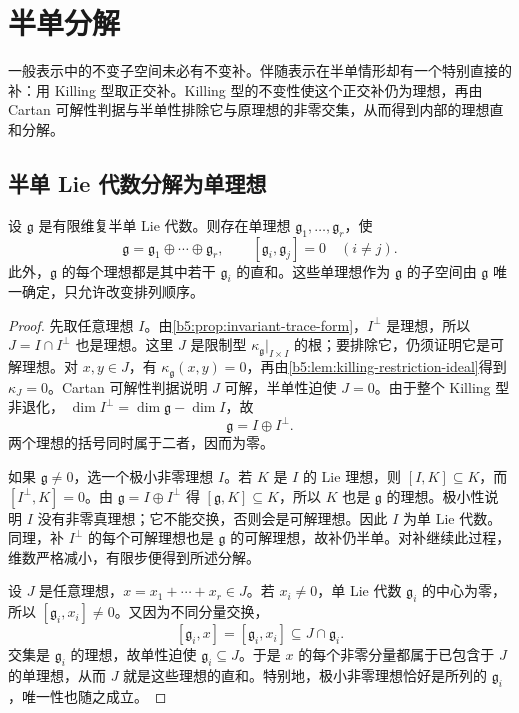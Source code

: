 
\section{半单分解}
\label{b5:sec:1303}

%
%

一般表示中的不变子空间未必有不变补。伴随表示在半单情形却有一个特别直接的补：用 Killing 型取正交补。Killing 型的不变性使这个正交补仍为理想，再由 Cartan 可解性判据与半单性排除它与原理想的非零交集，从而得到内部的理想直和分解。

\subsection{半单 Lie 代数分解为单理想}
\label{b5:subsec:1303:01}

\begin{theorem}\label{b5:thm:semisimple-ideal-decomposition}
	设 \(\mathfrak g\) 是有限维复半单 Lie 代数。则存在单理想 \(\mathfrak g_1,\ldots,\mathfrak g_r\)，使
	\[
		\mathfrak g=\mathfrak g_1\oplus\cdots\oplus\mathfrak g_r, \qquad[\mathfrak g_i,\mathfrak g_j]=0\quad(i\ne j).
	\]
	此外，\(\mathfrak g\) 的每个理想都是其中若干 \(\mathfrak g_i\) 的直和。这些单理想作为 \(\mathfrak g\) 的子空间由 \(\mathfrak g\) 唯一确定，只允许改变排列顺序。
\end{theorem}
\begin{proof}
	先取任意理想 \(I\)。由\cref{b5:prop:invariant-trace-form}，\(I^\perp\) 是理想，所以 \(J=I\cap I^\perp\) 也是理想。这里 \(J\) 是限制型 \(\kappa_{\mathfrak g}|_{I\times I}\) 的根；要排除它，仍须证明它是可解理想。对 \(x,y\in J\)，有 \(\kappa_{\mathfrak g}(x,y)=0\)，再由\cref{b5:lem:killing-restriction-ideal}得到 \(\kappa_J=0\)。Cartan 可解性判据说明 \(J\) 可解，半单性迫使 \(J=0\)。由于整个 Killing 型非退化， \(\dim I^\perp=\dim\mathfrak g-\dim I\)，故
	\[
		\mathfrak g=I\oplus I^\perp.
	\]
	两个理想的括号同时属于二者，因而为零。

	如果 \(\mathfrak g\ne0\)，选一个极小非零理想 \(I\)。若 \(K\) 是 \(I\) 的 Lie 理想，则 \([I,K]\subseteq K\)，而 \([I^\perp,K]=0\)。由 \(\mathfrak g=I\oplus I^\perp\) 得 \([\mathfrak g,K]\subseteq K\)，所以 \(K\) 也是 \(\mathfrak g\) 的理想。极小性说明 \(I\) 没有非零真理想；它不能交换，否则会是可解理想。因此 \(I\) 为单 Lie 代数。同理，补 \(I^\perp\) 的每个可解理想也是 \(\mathfrak g\) 的可解理想，故补仍半单。对补继续此过程，维数严格减小，有限步便得到所述分解。

	设 \(J\) 是任意理想，\(x=x_1+\cdots+x_r\in J\)。若 \(x_i\ne0\)，单 Lie 代数 \(\mathfrak g_i\) 的中心为零，所以 \([\mathfrak g_i,x_i]\ne0\)。又因为不同分量交换，
	\[
		[\mathfrak g_i,x]=[\mathfrak g_i,x_i]\subseteq J\cap\mathfrak g_i.
	\]
	交集是 \(\mathfrak g_i\) 的理想，故单性迫使 \(\mathfrak g_i\subseteq J\)。于是 \(x\) 的每个非零分量都属于已包含于 \(J\) 的单理想，从而 \(J\) 就是这些理想的直和。特别地，极小非零理想恰好是所列的 \(\mathfrak g_i\)，唯一性也随之成立。
\end{proof}

